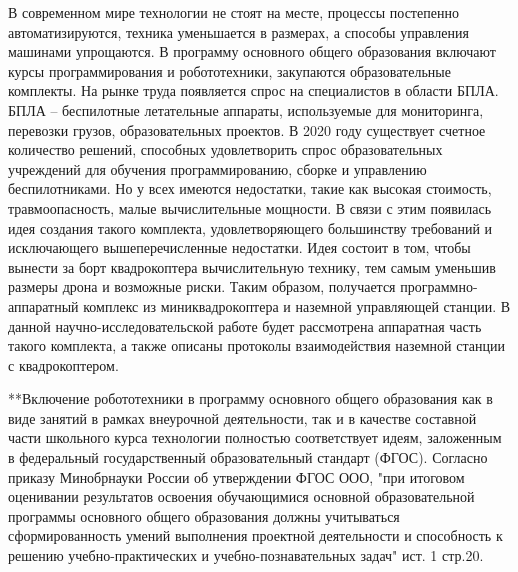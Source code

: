 В современном мире технологии не стоят на месте, процессы постепенно автоматизируются, техника уменьшается в размерах, а способы управления машинами упрощаются. В программу основного общего образования включают курсы программирования и робототехники, закупаются образовательные комплекты. На рынке труда появляется спрос на специалистов в области БПЛА. БПЛА -- беспилотные летательные аппараты, используемые для мониторинга, перевозки грузов, образовательных проектов. В 2020 году существует счетное количество решений, способных удовлетворить спрос образовательных учреждений для обучения программированию, сборке и управлению беспилотниками. Но у всех имеются недостатки, такие как высокая стоимость, травмоопасность, малые вычислительные мощности. В связи с этим появилась идея создания такого комплекта, удовлетворяющего большинству требований и исключающего вышеперечисленные недостатки. Идея состоит в том, чтобы вынести за борт квадрокоптера вычислительную технику, тем самым уменьшив размеры дрона и возможные риски. Таким образом, получается программно-аппаратный комплекс из миниквадрокоптера и наземной управляющей станции. 
В данной научно-исследовательской работе будет рассмотрена аппаратная часть такого комплекта, а также описаны протоколы взаимодействия наземной станции с квадрокоптером.


**Включение робототехники в программу основного общего образования как в виде занятий в рамках внеурочной деятельности, так и в качестве составной части школьного курса технологии полностью соответствует идеям, заложенным в федеральный государственный образовательный стандарт (ФГОС). Согласно приказу Минобрнауки России об утверждении ФГОС ООО, "при итоговом оценивании результатов освоения обучающимися основной образовательной программы основного общего образования должны учитываться сформированность умений выполнения проектной деятельности и способность к решению учебно-практических и учебно-познавательных задач" ист. 1 стр.20.
